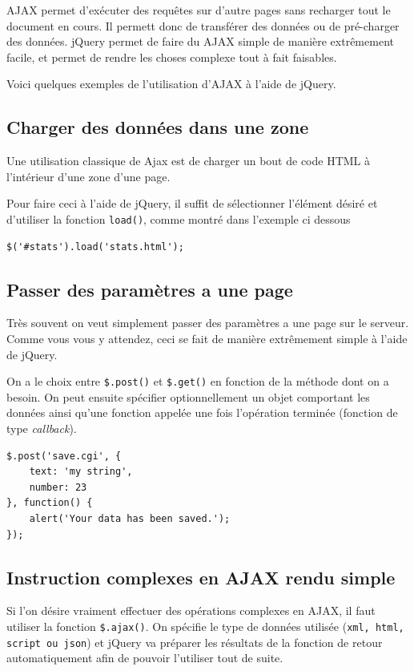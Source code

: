 \documentclass[10pt,a4paper,titlepage]{article}
\begin{document}
AJAX permet d'exécuter des requêtes sur d'autre pages sans recharger tout le document en cours. Il permett donc de transférer des données ou de pré-charger des données. jQuery permet de faire du AJAX simple de manière extrêmement facile, et permet de rendre les choses complexe tout à fait faisables. 

Voici quelques exemples de l'utilisation d'AJAX à l'aide de jQuery.

\subsection{Charger des données dans une zone}

Une utilisation classique de Ajax est de charger un bout de code HTML à l'intérieur d'une zone d'une page.

Pour faire ceci à l'aide de jQuery, il suffit de sélectionner l'élément désiré et d'utiliser la fonction \texttt{load()}, comme montré dans l'exemple ci dessous 

\begin{lstlisting}
$('#stats').load('stats.html');
\end{lstlisting}


\subsection{Passer des paramètres a une page}

Très souvent on veut simplement passer des paramètres a une page sur le serveur. Comme vous vous y attendez, ceci se fait de manière extrêmement simple à l'aide de jQuery. 

On a le choix entre \texttt{\$.post()} et \texttt{\$.get()} en fonction de la méthode dont on a besoin. On peut ensuite spécifier optionnellement un objet comportant les données ainsi qu'une fonction appelée une fois l'opération terminée (fonction de type \emph{callback}).

\begin{lstlisting}
$.post('save.cgi', {
    text: 'my string',
    number: 23
}, function() {
    alert('Your data has been saved.');
});
\end{lstlisting}
                                   
\subsection{Instruction complexes en AJAX rendu simple}

Si l'on désire vraiment effectuer des opérations complexes en AJAX, il faut utiliser la fonction \texttt{\$.ajax()}. On spécifie le type de données utilisée (\texttt{xml, html, script ou json}) et jQuery va préparer les résultats de la fonction de retour automatiquement afin de pouvoir l'utiliser tout de suite. 
\end{document}
